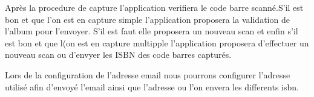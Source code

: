 Après la procedure de capture l'application verifiera le code barre scanné.S'il est bon et que l'on est en capture simple l'application proposera la validation de l'album pour l'envoyer.
S'il est faut elle proposera un nouveau scan et enfin s'il est bon et que l(on est en capture multipple l'application proposera d'effectuer un nouveau scan ou d'envyer les ISBN des code barres capturés.

\begin{figure}[htbp]
  \begin{center}
    \leavevmode
    \hspace{4cm}
  \end{center}
\end{figure}

Lors de la configuration de l'adresse email nous pourrons configurer l'adresse utilisé afin d'envoyé l'email ainsi que l'adresse ou l'on envera les differents isbn.
\newpage{}

